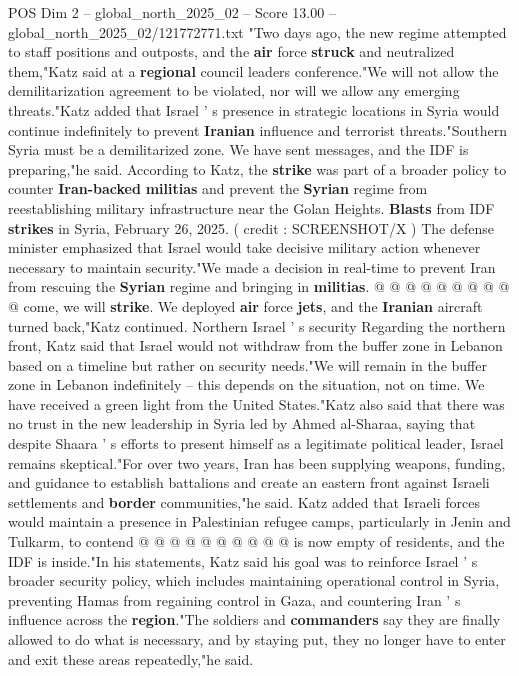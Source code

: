 \begin{textsample}{POS Dim 2 – global\_north\_2025\_02 – Score 13.00 – global\_north\_2025\_02/121772771.txt}  \label{ex:f2_pos_439}
"Two days ago, the new regime attempted to staff positions and outposts, and the \textbf{air} force \textbf{struck} and neutralized them,"Katz said at a \textbf{regional} council leaders conference."We will not allow the demilitarization agreement to be violated, nor will we allow any emerging threats."Katz added that Israel ' s presence in strategic locations in Syria would continue indefinitely to prevent \textbf{Iranian} influence and terrorist threats."Southern Syria must be a demilitarized zone.
We have sent messages, and the IDF is preparing,"he said.
According to Katz, the \textbf{strike} was part of a broader policy to counter \textbf{Iran-backed} \textbf{militias} and prevent the \textbf{Syrian} regime from reestablishing military infrastructure near the Golan Heights. \textbf{Blasts} from IDF \textbf{strikes} in Syria, February 26, 2025. ( credit : SCREENSHOT/X ) The defense minister emphasized that Israel would take decisive military action whenever necessary to maintain security."We made a decision in real-time to prevent Iran from rescuing the \textbf{Syrian} regime and bringing in \textbf{militias}. @ @ @ @ @ @ @ @ @ @ come, we will \textbf{strike}.
We deployed \textbf{air} force \textbf{jets}, and the \textbf{Iranian} aircraft turned back,"Katz continued.
Northern Israel ' s security Regarding the northern front, Katz said that Israel would not withdraw from the buffer zone in Lebanon based on a timeline but rather on security needs."We will remain in the buffer zone in Lebanon indefinitely -- this depends on the situation, not on time.
We have received a green light from the United States."Katz also said that there was no trust in the new leadership in Syria led by Ahmed al-Sharaa, saying that despite Shaara ' s efforts to present himself as a legitimate political leader, Israel remains skeptical."For over two years, Iran has been supplying weapons, funding, and guidance to establish battalions and create an eastern front against Israeli settlements and \textbf{border} communities,"he said.
Katz added that Israeli forces would maintain a presence in Palestinian refugee camps, particularly in Jenin and Tulkarm, to contend @ @ @ @ @ @ @ @ @ @ is now empty of residents, and the IDF is inside."In his statements, Katz said his goal was to reinforce Israel ' s broader security policy, which includes maintaining operational control in Syria, preventing Hamas from regaining control in Gaza, and countering Iran ' s influence across the \textbf{region}."The soldiers and \textbf{commanders} say they are finally allowed to do what is necessary, and by staying put, they no longer have to enter and exit these areas repeatedly,"he said.

\end{textsample}
